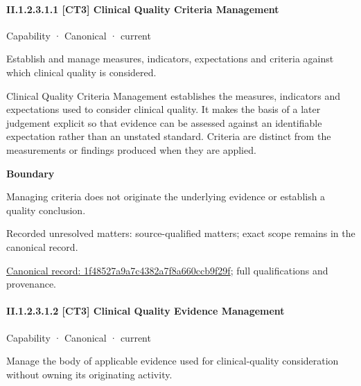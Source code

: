 \paragraph*{II.1.2.3.1.1 [CT3] Clinical Quality Criteria Management}
\label{navigation:II.1.2.3.1.1}

\label{element:1f48527a9a7c4382a7f8a660ccb9f29f}
{\small Capability · Canonical · current}\par

Establish and manage measures, indicators, expectations and criteria against which clinical quality is considered.



Clinical Quality Criteria Management establishes the measures, indicators and expectations used to consider clinical quality. It makes the basis of a later judgement explicit so that evidence can be assessed against an identifiable expectation rather than an unstated standard. Criteria are distinct from the measurements or findings produced when they are applied.



\textbf{Boundary}



Managing criteria does not originate the underlying evidence or establish a quality conclusion.


{\small Recorded unresolved matters: source-qualified matters; exact scope remains in the canonical record.}\par
{\footnotesize \href{../../../../continuum/strategy/capability/1f48527a9a7c4382a7f8a660ccb9f29f.md}{Canonical record: 1f48527a9a7c4382a7f8a660ccb9f29f}; full qualifications and provenance.}\par
\paragraph*{II.1.2.3.1.2 [CT3] Clinical Quality Evidence Management}
\label{navigation:II.1.2.3.1.2}

\label{element:1b0a1c6945ed4fadba045ff4753c104c}
{\small Capability · Canonical · current}\par

Manage the body of applicable evidence used for clinical-quality consideration without owning its originating activity.



